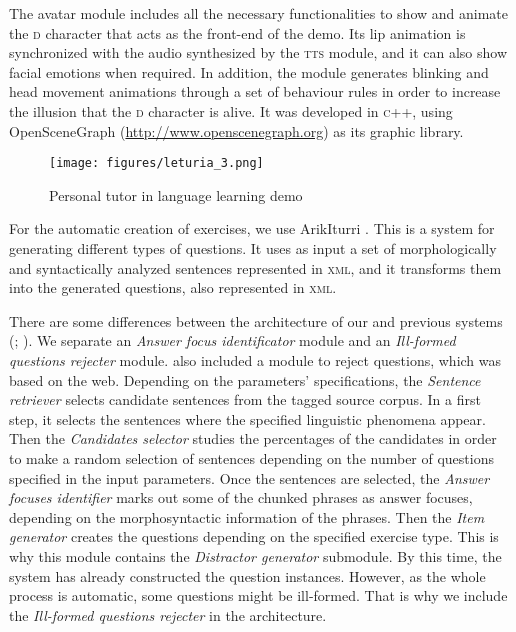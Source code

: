 \documentclass[output=paper]{LSP/langsci}
\begin{document}
The avatar module includes all the necessary functionalities to show and animate the \textsc{d} character that acts as the front-end of the demo. Its lip animation is synchronized with the audio synthesized by the \textsc{tts} module, and it can also show facial emotions when required. In addition, the module generates blinking and head movement animations through a set of behaviour rules in order to increase the illusion that the \textsc{d} character is alive. It was developed in \textsc{c++}, using OpenSceneGraph (\url{http://www.openscenegraph.org}) as its graphic library.

\begin{figure}
\texttt{[image: figures/leturia\_3.png]}
\caption{Personal tutor in language learning demo}
\label{fig:leturia:3}
\end{figure} 

For the automatic creation of exercises, we use ArikIturri \citep{Aldabe2010}. This is a system for generating different types of questions. It uses as input a set of morphologically and syntactically analyzed sentences represented in \textsc{xml}, and it transforms them into the generated questions, also represented in \textsc{xml}. 

There are some differences between the architecture of our and previous systems (\citealt{KraiftEtAl2004}; \citealt{SchwartzEtAl2004}). We separate an \textit{Answer focus identificator} module and an \textit{Ill-formed questions rejecter} module. \citet{SumitaEtAl2005} also included a module to reject questions, which was based on the web. Depending on the parameters' specifications, the \textit{Sentence retriever} selects candidate sentences from the tagged source corpus. In a first step, it selects the sentences where the specified linguistic phenomena appear. Then the \textit{Candidates selector} studies the percentages of the candidates in order to make a random selection of sentences depending on the number of questions specified in the input parameters. Once the sentences are selected, the \textit{Answer focuses identifier} marks out some of the chunked phrases as answer focuses, depending on the morphosyntactic information of the phrases. Then the \textit{Item generator} creates the questions depending on the specified exercise type. This is why this module contains the \textit{Distractor generator} submodule. By this time, the system has already constructed the question instances. However, as the whole process is automatic, some questions might be ill-formed. That is why we include the \textit{Ill-formed questions rejecter} in the architecture.
\end{document}
